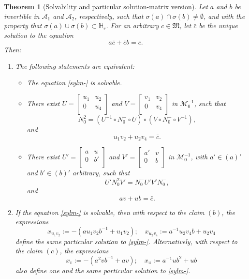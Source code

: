 \documentclass{article}
\newtheorem{theorem}{Theorem}[section]
\theoremstyle{definition}
\def\A{{\mathcal{A}}}
\def\M{\mathfrak{M}}
\def\HR{\mathbb{H}_r}
\newcommand{\mat}[4]{\left[\begin{array}{cc}#1 & #2 \\ #3 & #4 \\
	\end{array}\right]}
\begin{document}
\begin{theorem}[Solvability and particular solution-matrix version]\label{part} Let $a$ and $b$ be invertible in $\A_1$ and $\A_2$, respectively, such that $\sigma(a)\cap\sigma(b)\neq\emptyset$, and with the property that $\sigma(a)\cup\sigma(b)\subset\HR$. For an arbitrary $c\in\M$, let $\bar{c}$ be the unique solution to the equation
\begin{equation}
\label{sylC}a\bar{c}+\bar{c}b=c.\end{equation} 
Then:
\begin{enumerate}
\item The following statements are equivalent:
\begin{itemize}
\item[(a)] The equation \eqref{sylm-} is solvable.
\item[(b)] There exist $U=\mat{u_1}{u_2}{0}{u_4}$ and $V=\mat{v_1}{v_2}{0}{v_4}$ in $\mathcal{M}^{-1}_0$, such that
\begin{equation}\label{MUN0V}N_0^2=\left(U^{-1}\circ N^-_0\circ U\right)\circ\left(V\circ N^-_0\circ V^{-1}\right),\end{equation}
and 
\begin{equation}
\label{uivjbarc}u_1v_2+u_2v_4=\bar{c}.
\end{equation}

\item[(c)] There exist $U'=\mat{a}{u}{0}{b'}$ and $V'=\mat{a'}{v}{0}{b}$ in $\mathcal{M}^{-1}_0$, with $a'\in (a)'$ and $b'\in (b)'$ arbitrary, such that
\begin{equation}\label{U'V'}
U'N_0^2V'=N^-_0 U'V'N^-_0,\end{equation}
and
\begin{equation}
\label{gensyl0}av+ub=\bar{c}.
\end{equation} 
\end{itemize}
\item If the equation \eqref{sylm-} is solvable, then with respect to the claim $(b)$, the expressions
\begin{equation}\label{solu12v12}
x_{u_1v_2}:=-(au_1v_2b^{-1}+u_1v_2);\quad x_{u_2v_4}:=a^{-1}u_2v_4b+u_2v_4
\end{equation}
define the same particular solution to \eqref{sylm-}. Alternatively, with respect to the claim $(c)$,  the expressions
\begin{equation}\label{soluvab}
x_v:=-(a^2vb^{-1}+av);\quad x_u:=a^{-1}ub^2+ub
\end{equation}
also define one and the same particular solution to \eqref{sylm-}.
\end{enumerate}
\end{theorem}
\end{document}
